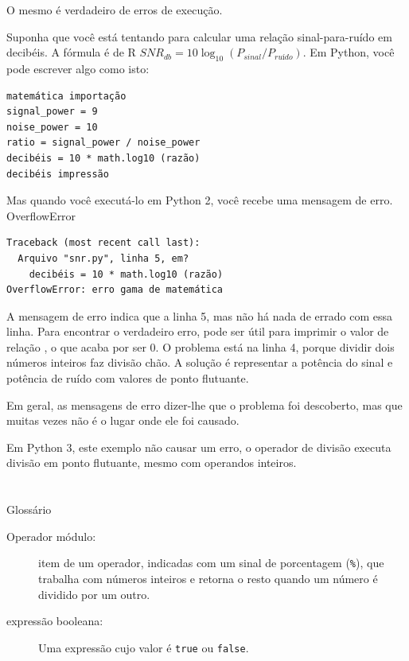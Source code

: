 \documentclass[10pt]{book}
\begin{document}
\begin{exercise}
{{O mesmo é verdadeiro de erros de execução.  

Suponha que você está tentando
para calcular uma relação sinal-para-ruído em decibéis. A fórmula
é de R $ SNR_ {db} = 10 \log_ {10} (P_ {sinal} / P_ {ruído}) $. Em Python,
você pode escrever algo como isto:

\begin{verbatim}
matemática importação
signal_power = 9
noise_power = 10
ratio = signal_power / noise_power
decibéis = 10 * math.log10 (razão)
decibéis impressão
\end{verbatim}
%
Mas quando você executá-lo em Python 2, você recebe uma mensagem de erro.
\index{} OverflowError

\begin{verbatim}
Traceback (most recent call last):
  Arquivo "snr.py", linha 5, em?
    decibéis = 10 * math.log10 (razão)
OverflowError: erro gama de matemática
\end{verbatim}
%
A mensagem de erro indica que a linha 5, mas não há nada
de errado com essa linha. Para encontrar o verdadeiro erro, pode ser
útil para imprimir o valor de {relação \tt}, o que acaba por
ser 0. O problema está na linha 4, porque dividir dois números inteiros
faz divisão chão. A solução é representar a potência do sinal
e potência de ruído com valores de ponto flutuante.

Em geral, as mensagens de erro dizer-lhe que o problema foi descoberto, 
mas que muitas vezes não é o lugar onde ele foi causado.

Em Python 3, este exemplo não causar um erro, o operador de divisão
executa divisão em ponto flutuante, mesmo com operandos inteiros.


\section{} Glossário

\begin{description}

\item[Operador módulo:] item de um operador, indicadas com um sinal de porcentagem
({\tt \%}), que trabalha com números inteiros e retorna o resto quando um
número é dividido por um outro.

\item[expressão booleana:] Uma expressão cujo valor é 
{\tt true} ou {\tt false}.


\end{description}}}
\end{exercise}
\end{document}
